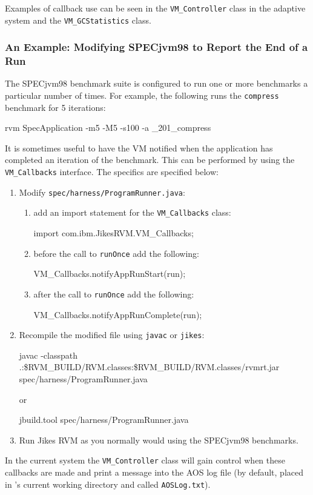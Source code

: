 Examples of callback use can be seen in the {\tt VM\_Controller} class in the
adaptive system and the {\tt VM\_GCStatistics} class.

\subsubsection{An Example: Modifying SPECjvm98 to Report the End of a
                  Run}\label{sssec:callback-example}

The SPECjvm\Rboth{}98 benchmark suite is configured to run one or more
benchmarks 
a particular number of times.  For example, the following runs the
{\tt compress} benchmark for 5 iterations:
\begin{example}
 rvm SpecApplication -m5 -M5 -s100 -a \_201\_compress
\end{example}
It is sometimes useful to have the VM notified when the application
has completed an iteration of the benchmark.   This can be performed
by using the {\tt VM\_Callbacks} interface.  The specifics are
specified below:
\begin{enumerate}
\item Modify {\tt spec/harness/ProgramRunner.java}:
	\begin{enumerate}

	\item add an import statement for the {\tt VM\_Callbacks} class:
        \begin{example}
        import com.ibm.JikesRVM.VM\_Callbacks;
        \end{example}

	\item before the call to {\tt runOnce} add the following:
        \begin{example}
        VM\_Callbacks.notifyAppRunStart(run);
        \end{example}

	\item after the call to {\tt runOnce} add the following:
        \begin{example}
        VM\_Callbacks.notifyAppRunComplete(run);
        \end{example}

	\end{enumerate}

\item Recompile the modified file using {\tt javac} or {\tt jikes}:
\begin{example}
javac -classpath 
   .:\$RVM\_\-BUILD/\-RVM.clas\-ses:\$RVM\_\-BUILD/\-RVM.clas\-ses/\-rvmrt.jar
   spec/\-har\-ness/\-Pro\-gram\-Run\-ner.java
\end{example}
or
\begin{example}
jbuild.tool spec/\-har\-ness/\-Pro\-gram\-Run\-ner.java
\end{example}

\item Run Jikes RVM as you normally would using the SPECjvm98 benchmarks.
\end{enumerate}

In the current system the {\tt VM\_Controller} class will gain control
when these callbacks are made and print a message into the 
AOS log
file (by default, placed in \jrvm{}'s current working directory and called \texttt{AOSLog.txt}).


